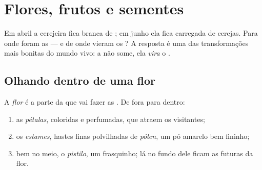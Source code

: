 \chapter{Flores, frutos e sementes}\label{ch:g3:flowers-fruits-seeds}

Em abril a cerejeira fica branca de ; em junho ela fica
carregada de cerejas. Para onde foram as  --- e de onde vieram
os ? A resposta é uma das transformações mais bonitas do mundo
vivo: a  não some, ela \emph{vira} o .

\section{Olhando dentro de uma flor}

\begin{definition}\label{def:g3:flowers-fruits-seeds:parts}
A \emph{flor} é a parte da  que vai fazer as
. De fora para dentro:
\begin{enumerate}
  \item as \emph{pétalas}, coloridas e perfumadas, que
        atraem os  visitantes;
  \item os \emph{estames}, hastes finas polvilhadas de
        \emph{pólen}, um pó amarelo bem fininho;
  \item bem no meio, o \emph{pistilo}, um frasquinho;
        lá no fundo dele ficam as futuras  da flor.
\end{enumerate}
\end{definition}

